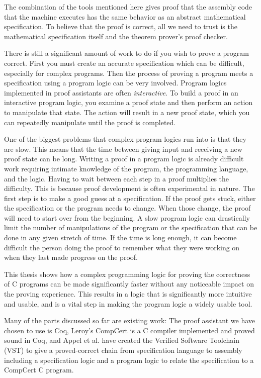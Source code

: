 \documentclass{puthesis}
\begin{document}
The combination of the tools mentioned here gives proof that the
assembly code that the machine executes has the same behavior as an
abstract mathematical specification. To believe that the proof is
correct, all we need to trust is the mathematical specification itself
and the theorem prover's proof checker.

There is still a significant amount of work to do if you wish to prove
a program correct. First you must create an accurate specification
which can be difficult, especially for complex programs. Then the
process of proving a program meets a specification using a program
logic can be very involved. Program logics implemented in proof
assistants are often \emph{interactive}. To build a proof in an
interactive program logic, you examine a proof state and then perform
an action to manipulate that state. The action will result in a new
proof state, which you can repeatedly manipulate 
until the proof is completed.

One of the biggest problems that complex program logics run into is
that they are slow. This means that the time between giving input and
receiving a new proof state can be long. Writing a proof in a program
logic is already difficult work requiring intimate knowledge of the
program, the programming language, and the logic. Having to wait
between each step in a proof multiplies the difficulty.  This is
because proof development is often experimental in nature. The first
step is to make a good guess at a specification. If the proof gets
stuck, either the specification or the program needs to change. When
those change, the proof will need to start over from the beginning. A
slow program logic can drastically limit the number of manipulations
of the program or the specification that can be done in any given
stretch of time. If the time is long enough, it can become difficult
the person doing the proof to remember what they were working on when
they last made progress on the proof.

This thesis shows how a complex programming logic for proving the
correctness of C programs can be made significantly faster without any
noticeable impact on the proving experience. This results in a logic
that is significantly more intuitive and usable, and is a vital step
in making the program logic a widely usable tool.

Many of the parts discussed so far are existing work: The proof
assistant we have chosen to use is Coq, Leroy's CompCert \cite{} is a
C compiler implemented and proved sound in Coq, and Appel et al. have
created the Verified Software Toolchain (VST) to give a proved-correct
chain from specification language to assembly including a
specification logic and a program logic to relate the specification to
a CompCert C program.
\end{document}
